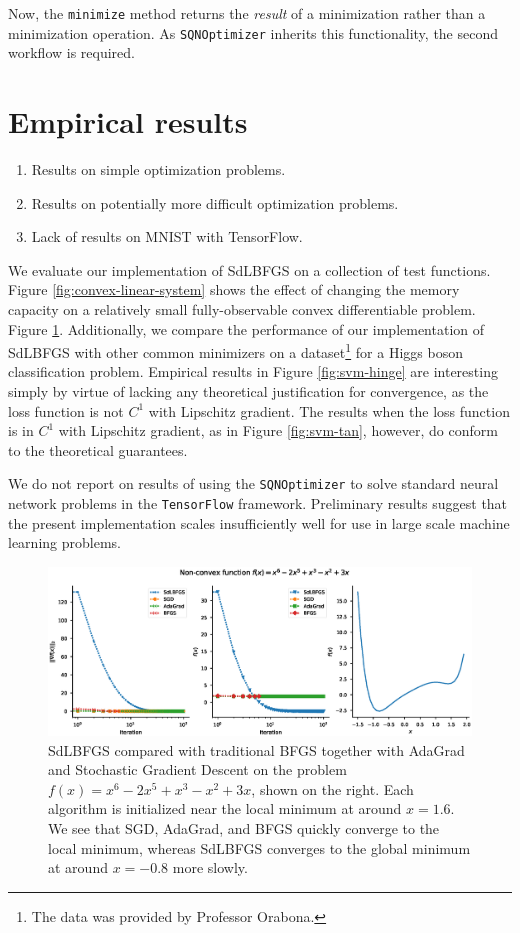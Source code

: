 \documentclass{article}
\begin{document}
Now, the \texttt{minimize} method returns the \emph{result} of a minimization
rather than a minimization operation. As \texttt{SQNOptimizer} inherits this
functionality, the second workflow is required. 


\section{Empirical results}


\begin{enumerate}
  \item Results on simple optimization problems. 
  \item Results on potentially more difficult optimization problems.
  \item Lack of results on MNIST with TensorFlow.
\end{enumerate}

We evaluate our implementation of SdLBFGS on a collection of test functions.
Figure \ref{fig:convex-linear-system} shows the effect of changing the memory
capacity on a relatively small fully-observable convex differentiable problem.
Figure \ref{fig:nonconvex-comparison}. Additionally, we compare the performance
of our implementation of SdLBFGS with other common minimizers on a
dataset\footnote{The data was provided by Professor Orabona.} for a Higgs boson
classification problem. Empirical results in Figure \ref{fig:svm-hinge} are
interesting simply by virtue of lacking any theoretical justification for
convergence, as the loss function is not $C^1$ with Lipschitz gradient. The
results when the loss function is in $C^1$ with Lipschitz gradient, as in Figure
\ref{fig:svm-tan}, however, do conform to the theoretical guarantees.

We do not report on results of using the \texttt{SQNOptimizer} to solve
standard neural network problems in the \texttt{TensorFlow} framework.
Preliminary results suggest that the present implementation scales
insufficiently well for use in large scale machine learning problems.



\begin{figure}[h]
  \centering
  \includegraphics[width=\textwidth]{../plots/nonconvex_results}
  \caption{
    SdLBFGS compared with traditional BFGS together with AdaGrad and Stochastic
    Gradient Descent on the problem $f(x) = x^6 - 2x^5 + x^3 - x^2 + 3x$, shown
    on the right. Each algorithm is initialized near the local minimum at around
    $x = 1.6$. We see that SGD, AdaGrad, and BFGS quickly converge to the local
    minimum, whereas SdLBFGS converges to the global minimum at around $x =
    -0.8$ more slowly.
  }
  \label{fig:nonconvex-comparison}
\end{figure}
\end{document}
